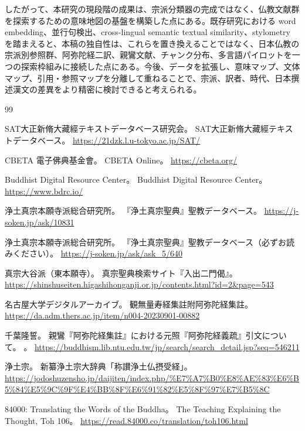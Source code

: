 \documentclass[uplatex,dvipdfmx,11pt,a4paper]{jsarticle}
\begin{document}
したがって、本研究の現段階の成果は、宗派分類器の完成ではなく、仏教文献群を探索するための意味地図の基盤を構築した点にある。既存研究における word embedding、並行句検出、cross-lingual semantic textual similarity、stylometry を踏まえると、本稿の独自性は、これらを置き換えることではなく、日本仏教の宗派別参照群、阿弥陀経二訳、親鸞文献、チャンク分布、多言語パイロットを一つの探索枠組みに接続した点にある。今後、データを拡張し、意味マップ、文体マップ、引用・参照マップを分離して重ねることで、宗派、訳者、時代、日本撰述漢文の差異をより精密に検討できると考えられる。

\begin{thebibliography}{99}

SAT大正新脩大藏經テキストデータベース研究会。
\newblock SAT大正新脩大藏經テキストデータベース。
\newblock \url{https://21dzk.l.u-tokyo.ac.jp/SAT/}

CBETA 電子佛典基金會。
\newblock CBETA Online。
\newblock \url{https://cbeta.org/}

Buddhist Digital Resource Center。
\newblock Buddhist Digital Resource Center。
\newblock \url{https://www.bdrc.io/}

浄土真宗本願寺派総合研究所。
\newblock 『浄土真宗聖典』聖教データベース。
\newblock \url{https://j-soken.jp/ask/10831}

浄土真宗本願寺派総合研究所。
\newblock 『浄土真宗聖典』聖教データベース（必ずお読みください）。
\newblock \url{https://j-soken.jp/ask/ask_5/640}

真宗大谷派（東本願寺）。
\newblock 真宗聖典検索サイト『入出二門偈』。
\newblock \url{https://shinshuseiten.higashihonganji.or.jp/contents.html?id=2&page=543}

名古屋大学デジタルアーカイブ。
\newblock 観無量寿経集註附阿弥陀経集註。
\newblock \url{https://da.adm.thers.ac.jp/item/n004-20230901-00882}

千葉隆誓。
\newblock 親鸞『阿弥陀経集註』における元照『阿弥陀経義疏』引文について。
。
\newblock \url{https://buddhism.lib.ntu.edu.tw/jp/search/search_detail.jsp?seq=546211}

浄土宗。
\newblock 新纂浄土宗大辞典「称讃浄土仏摂受経」。
\newblock \url{https://jodoshuzensho.jp/daijiten/index.php/%E7%A7%B0%E8%AE%83%E6%B5%84%E5%9C%9F%E4%BB%8F%E6%91%82%E5%8F%97%E7%B5%8C}

84000: Translating the Words of the Buddha。
\newblock The Teaching Explaining the Thought, Toh 106。
\newblock \url{https://read.84000.co/translation/toh106.html}


\end{thebibliography}
\end{document}
